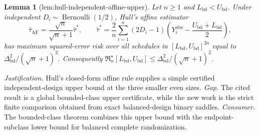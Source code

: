 \documentclass{article}
\newtheorem{lemma}{Lemma}
\begin{document}
\begin{lemma}[lem:hull-independent-affine-upper]\label{lem:hull-independent-affine-upper}
Let \(n\geq1\) and \(L_{\mathrm{bd}}<U_{\mathrm{bd}}\).  Under independent \(D_i\sim\operatorname{Bernoulli}(1/2)\), Hull's affine estimator
\[
 \widehat\tau_{\mathrm{AF}}
 =\frac{\sqrt n}{\sqrt n+1}\widehat\tau^*,\qquad
 \widehat\tau^*=\frac2n\sum_{i=1}^n(2D_i-1)
 \left(Y_i^{\mathrm{obs}}-\frac{U_{\mathrm{bd}}+L_{\mathrm{bd}}}{2}\right),
\]
has maximum squared-error risk over all schedules in \([L_{\mathrm{bd}},U_{\mathrm{bd}}]^{2n}\) equal to
\(
 \Delta_{\mathrm{bd}}^2/(\sqrt n+1)^2.
\)
Consequently \(\mathfrak R_n^\star[L_{\mathrm{bd}},U_{\mathrm{bd}}]\leq\Delta_{\mathrm{bd}}^2/(\sqrt n+1)^2\).
\end{lemma}
\par\smallskip\noindent \textit{Justification.} Hull's closed-form affine rule supplies a simple certified independent-design upper bound at the three smaller even sizes. \textit{Gap.} The cited result is a global bounded-class upper certificate, while the new work is the strict finite comparison obtained from exact balanced-design binary saddles. \textit{Consumer.} The bounded-class theorem combines this upper bound with the endpoint-subclass lower bound for balanced complete randomization.
\end{document}
